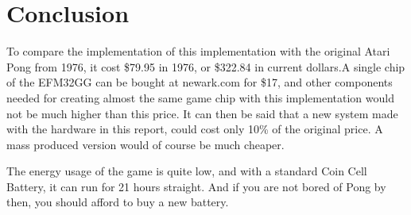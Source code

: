 \section{Conclusion}


To compare the implementation of this implementation with the original Atari
Pong from 1976, it cost \$79.95 in 1976\cite{pongreview}, or \$322.84 in
current dollars.\footnotemark A single chip of the EFM32GG can be bought at
newark.com for \$17, and other components needed for creating almost the same
game chip with this implementation would not be much higher than this price. It
can then be said that a new system made with the hardware in this report, could
cost only 10\% of the original price. A mass produced version would of course
be much cheaper.


The energy usage of the game is quite low, and with a standard Coin Cell
Battery\footnotemark, it can run for 21 hours straight. And if you are not
bored of Pong by then, you should afford to buy a new battery.

